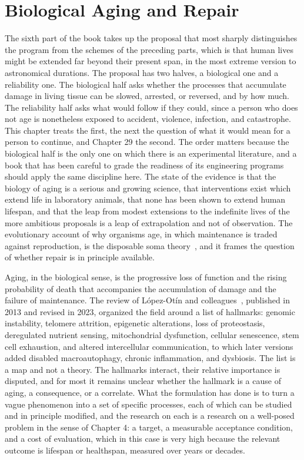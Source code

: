 \chapter{Biological Aging and Repair}
\label{ch:27}

The sixth part of the book takes up the proposal that most sharply distinguishes the program from the schemes of the preceding parts, which is that human lives might be extended far beyond their present span, in the most extreme version to astronomical durations. The proposal has two halves, a biological one and a reliability one. The biological half asks whether the processes that accumulate damage in living tissue can be slowed, arrested, or reversed, and by how much. The reliability half asks what would follow if they could, since a person who does not age is nonetheless exposed to accident, violence, infection, and catastrophe. This chapter treats the first, the next the question of what it would mean for a person to continue, and Chapter 29 the second. The order matters because the biological half is the only one on which there is an experimental literature, and a book that has been careful to grade the readiness of its engineering programs should apply the same discipline here. The state of the evidence is that the biology of aging is a serious and growing science, that interventions exist which extend life in laboratory animals, that none has been shown to extend human lifespan, and that the leap from modest extensions to the indefinite lives of the more ambitious proposals is a leap of extrapolation and not of observation. The evolutionary account of why organisms age, in which maintenance is traded against reproduction, is the disposable soma theory~\cite{kirkwood1977}, and it frames the question of whether repair is in principle available.

Aging, in the biological sense, is the progressive loss of function and the rising probability of death that accompanies the accumulation of damage and the failure of maintenance. The review of López-Otín and colleagues~\cite{lopezotin2013,lopezotin2023}, published in 2013 and revised in 2023, organized the field around a list of hallmarks: genomic instability, telomere attrition, epigenetic alterations, loss of proteostasis, deregulated nutrient sensing, mitochondrial dysfunction, cellular senescence, stem cell exhaustion, and altered intercellular communication, to which later versions added disabled macroautophagy, chronic inflammation, and dysbiosis. The list is a map and not a theory. The hallmarks interact, their relative importance is disputed, and for most it remains unclear whether the hallmark is a cause of aging, a consequence, or a correlate. What the formulation has done is to turn a vague phenomenon into a set of specific processes, each of which can be studied and in principle modified, and the research on each is a research on a well-posed problem in the sense of Chapter 4: a target, a measurable acceptance condition, and a cost of evaluation, which in this case is very high because the relevant outcome is lifespan or healthspan, measured over years or decades.

